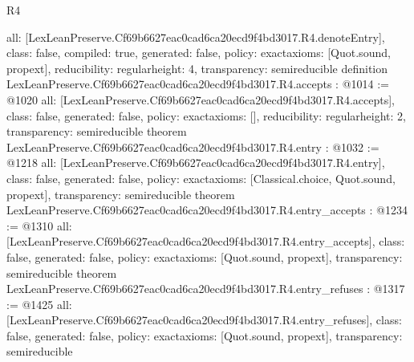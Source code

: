 \begin{lexlean}{R4}
\begin{coremodule}
{  all: [LexLeanPreserve.Cf69b6627eac0cad6ca20ecd9f4bd3017.R4.denoteEntry],
  class: false,
  compiled: true,
  generated: false,
  policy: exact{axioms: [Quot.sound, propext]},
  reducibility: regular{height: 4},
  transparency: semireducible
}
definition LexLeanPreserve.Cf69b6627eac0cad6ca20ecd9f4bd3017.R4.accepts : @1014 := @1020 {
  all: [LexLeanPreserve.Cf69b6627eac0cad6ca20ecd9f4bd3017.R4.accepts],
  class: false,
  generated: false,
  policy: exact{axioms: []},
  reducibility: regular{height: 2},
  transparency: semireducible
}
theorem LexLeanPreserve.Cf69b6627eac0cad6ca20ecd9f4bd3017.R4.entry : @1032 := @1218 {
  all: [LexLeanPreserve.Cf69b6627eac0cad6ca20ecd9f4bd3017.R4.entry],
  class: false,
  generated: false,
  policy: exact{axioms: [Classical.choice, Quot.sound, propext]},
  transparency: semireducible
}
theorem LexLeanPreserve.Cf69b6627eac0cad6ca20ecd9f4bd3017.R4.entry_accepts : @1234 := @1310 {
  all: [LexLeanPreserve.Cf69b6627eac0cad6ca20ecd9f4bd3017.R4.entry_accepts],
  class: false,
  generated: false,
  policy: exact{axioms: [Quot.sound, propext]},
  transparency: semireducible
}
theorem LexLeanPreserve.Cf69b6627eac0cad6ca20ecd9f4bd3017.R4.entry_refuses : @1317 := @1425 {
  all: [LexLeanPreserve.Cf69b6627eac0cad6ca20ecd9f4bd3017.R4.entry_refuses],
  class: false,
  generated: false,
  policy: exact{axioms: [Quot.sound, propext]},
  transparency: semireducible
}


\end{coremodule}
\end{lexlean}
